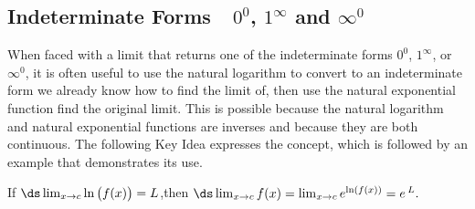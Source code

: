 \subsection*{Indeterminate Forms\ \ $0^0$, $1^\infty$ and $\infty^0$}

When faced with a limit that returns one of the indeterminate forms $0^0$, $1^\infty$, or $\infty^0$, it is often useful to use the natural logarithm to convert to an indeterminate form we already know how to find the limit of, then use the natural exponential function find the original limit. This is possible because the natural logarithm and natural exponential functions are inverses and because they are both continuous. The following Key Idea expresses the concept, which is followed by an example that demonstrates its use.

{If $\ds \lim_{x\to c} \ln\big(f(x)\big) = L$,\quad then 
$\ds \lim_{x\to c} f(x) = \lim_{x\to c} e^{\ln(f(x))} = e\,^L.$ }

